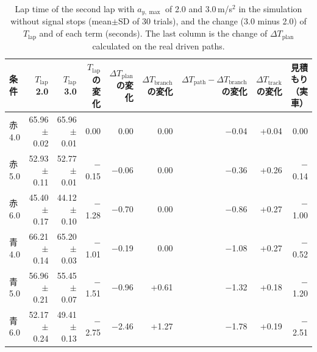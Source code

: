 \begin{table}[!htbp]
  \centering
  \caption[Lap time with $a_{y,\max}$ of 3.0 and 2.0 m/s$^2$ and the change by term.]{Lap time of the second lap with $a_{y,\max}$ of 2.0 and 3.0\,m/s$^2$ in the simulation without signal stops (mean$\pm$SD of 30 trials), and the change (3.0 minus 2.0) of $T_{\mathrm{lap}}$ and of each term (seconds). The last column is the change of $\Delta T_{\mathrm{plan}}$ calculated on the real driven paths.}
  \label{tab:sim_ay}
  \footnotesize
  \begin{lrbox}{\tblbox}\setlength{\tabcolsep}{3pt}\begin{tabular}{lrrrrrrrr}
    \toprule
    条件 & \shortstack[r]{$T_{\mathrm{lap}}$\\2.0} & \shortstack[r]{$T_{\mathrm{lap}}$\\3.0} & \shortstack[r]{$T_{\mathrm{lap}}$\\の変化} & \shortstack[r]{$\Delta T_{\mathrm{plan}}$\\の変化} & \shortstack[r]{$\Delta T_{\mathrm{branch}}$\\の変化} & \shortstack[r]{$\Delta T_{\mathrm{path}}-\Delta T_{\mathrm{branch}}$\\の変化} & \shortstack[r]{$\Delta T_{\mathrm{track}}$\\の変化} & \shortstack[r]{見積もり\\（実車）} \\
    \midrule
    赤\,4.0 & 65.96$\pm$ 0.02 & 65.96$\pm$ 0.01 & 0.00 & 0.00 & 0.00 & $-$0.04 & +0.04 & 0.00 \\
    赤\,5.0 & 52.93$\pm$ 0.11 & 52.77$\pm$ 0.01 & $-$0.15 & $-$0.06 & 0.00 & $-$0.36 & +0.26 & $-$0.14 \\
    赤\,6.0 & 45.40$\pm$ 0.17 & 44.12$\pm$ 0.10 & $-$1.28 & $-$0.70 & 0.00 & $-$0.86 & +0.27 & $-$1.00 \\
    \addlinespace[3pt]
    青\,4.0 & 66.21$\pm$ 0.14 & 65.20$\pm$ 0.03 & $-$1.01 & $-$0.19 & 0.00 & $-$1.08 & +0.27 & $-$0.52 \\
    青\,5.0 & 56.96$\pm$ 0.21 & 55.45$\pm$ 0.07 & $-$1.51 & $-$0.96 & +0.61 & $-$1.32 & +0.18 & $-$1.20 \\
    青\,6.0 & 52.17$\pm$ 0.24 & 49.41$\pm$ 0.13 & $-$2.75 & $-$2.46 & +1.27 & $-$1.78 & +0.19 & $-$2.51 \\
    \bottomrule
  \end{tabular}\end{lrbox}\usebox{\tblbox}
\end{table}

